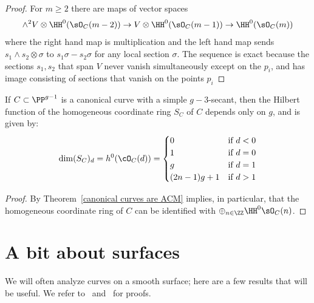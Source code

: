 \begin{proof}
For $m\geq 2$ there are maps of vector spaces
$$
\wedge^{2} V\otimes \HH^{0}(\sO_{C}(m-2)) \to V\otimes \HH^{0}(\sO_{C}(m-1)) 
\to \HH^{0}(\sO_{C}(m))
$$
where the right hand map is multiplication and the left hand map sends
$s_{1}\wedge s_{2}\otimes \sigma$ to $s_{1}\sigma-s_{2}\sigma$ for any local section $\sigma$.
The sequence is exact because the sections $s_{1},s_{2}$ that span $V$ never vanish simultaneously except on the $p_{i}$, and has image  consisting of sections that vanish on the points $p_{i}$

\end{proof}

\begin{corollary}\label{canonical hilbert function}
If $C\subset \PP^{g-1}$ is a canonical curve with a simple $g-3$-secant, then the Hilbert function of the homogeneous coordinate ring $S_{C}$ of  $C$ depends only on $g$, and is given by:
$$
\dim({S_{C}})_{d} = h^{0}(\cO_{C}(d)) = 
\begin{cases}
 0 &\mbox {if } d<0\\
 1 & \mbox {if }  d=0\\
 g & \mbox {if }  d=1\\
 (2n-1)g+1 & \mbox {if }  d>1\\
\end{cases}
$$
\end{corollary}
\begin{proof}
By Theorem~\ref{canonical curves are ACM} implies, in particular, that the homogeneous coordinate ring of $C$ can be identified with 
$\oplus_{n\in \ZZ}\HH^0\sO_C(n)$.  
\end{proof}

 \section{A bit about surfaces}
 We will often analyze curves  on a smooth surface; here are a few results that will be useful. We refer to~\cite[Chapter V]{Hartshorne1977}
 and~\cite[Chapter I]{B} for proofs.
 

